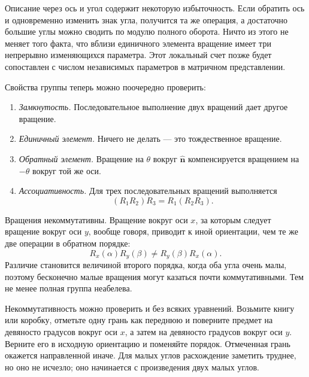 Описание через ось и угол содержит некоторую избыточность. Если обратить ось и одновременно изменить знак угла, получится та же операция, а достаточно большие углы можно сводить по модулю полного оборота. Ничто из этого не меняет того факта, что вблизи единичного элемента вращение имеет три непрерывно изменяющихся параметра. Этот локальный счет позже будет сопоставлен с числом независимых параметров в матричном представлении.

Свойства группы теперь можно поочередно проверить:
\begin{enumerate}
\item \emph{Замкнутость.} Последовательное выполнение двух вращений дает другое вращение.
\item \emph{Единичный элемент.} Ничего не делать — это тождественное вращение.
\item \emph{Обратный элемент.} Вращение на \(\theta\) вокруг \(\hat{\boldsymbol n}\) компенсируется вращением на \(-\theta\) вокруг той же оси.
\item \emph{Ассоциативность.} Для трех последовательных вращений выполняется
\[
(R_1R_2)R_3=R_1(R_2R_3).
\]
\end{enumerate}

Вращения некоммутативны. Вращение вокруг оси \(x\), за которым следует вращение вокруг оси \(y\), вообще говоря, приводит к иной ориентации, чем те же две операции в обратном порядке:
\begin{equation}
R_x(\alpha)R_y(\beta)\ne R_y(\beta)R_x(\alpha).
\end{equation}
Различие становится величиной второго порядка, когда оба угла очень малы, поэтому бесконечно малые вращения могут казаться почти коммутативными. Тем не менее полная группа неабелева.

Некоммутативность можно проверить и без всяких уравнений. Возьмите книгу или коробку, отметьте одну грань как переднюю и поверните предмет на девяносто градусов вокруг оси \(x\), а затем на девяносто градусов вокруг оси \(y\). Верните его в исходную ориентацию и поменяйте порядок. Отмеченная грань окажется направленной иначе. Для малых углов расхождение заметить труднее, но оно не исчезло; оно начинается с произведения двух малых углов.

\begin{classroomqa}
\end{classroomqa}

